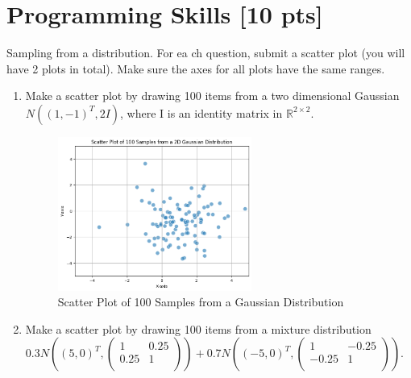 \documentclass[letter]{article}
\theoremstyle{definition}
\newenvironment{soln}{
	\leavevmode\color{black}\ignorespaces
}{}
\begin{document}
	\section{Programming Skills [10 pts]}
	Sampling from a distribution.  For ea          ch question, submit a scatter plot (you will have 2 plots in total).  Make sure the axes for all plots have the same ranges.
	\begin{enumerate}
		\item Make a scatter plot by drawing 100 items from a two dimensional Gaussian $N((1, -1)^{T}, 2I)$, where I is an identity matrix in $\mathbb{R}^{2 \times 2}$.
		
			\begin{soln}
			\begin{figure}[H]
                    \centering
                    \includegraphics[width=0.6\textwidth]{programming-1.png} %
                    \caption{Scatter Plot of 100 Samples from a Gaussian Distribution}
                    \label{fig:scatter_plot}
                \end{figure}
		\end{soln}
	
		\item Make a scatter plot by drawing 100 items from a mixture distribution 
		$0.3 N\left((5, 0)^{T}, \begin{pmatrix} 1 & 0.25 \\ 0.25 & 1\\ \end{pmatrix}\right)
		+0.7 N\left((-5, 0)^{T}, \begin{pmatrix} 1 & -0.25 \\ -0.25 & 1\\ \end{pmatrix}\right)
		$.
		

\end{enumerate}
\end{document}

